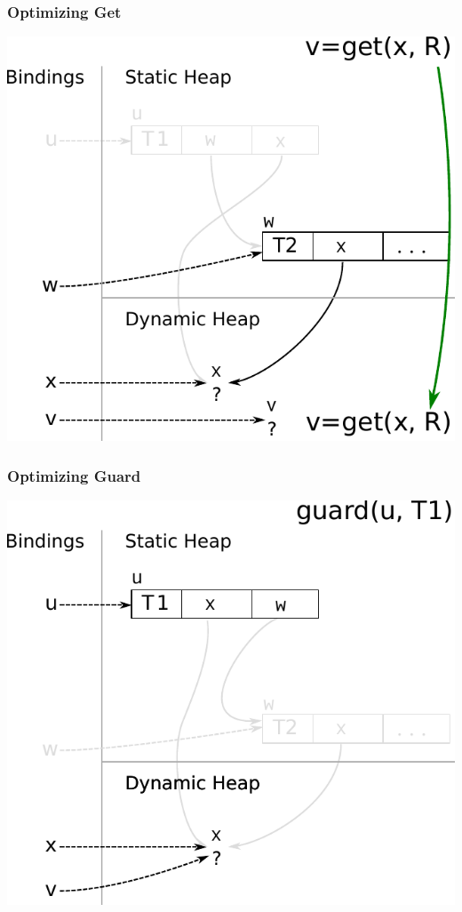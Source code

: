 \documentclass[utf8x]{beamer}
\begin{document}
\begin{frame}[plain]
  \frametitle{Optimizing Get}
  \includegraphics[scale=0.8]{figures/opt_get4}
\end{frame}

\begin{frame}[plain]
  \frametitle{Optimizing Guard}
  \includegraphics[scale=0.8]{figures/opt_guard1}
\end{frame}
\end{document}

